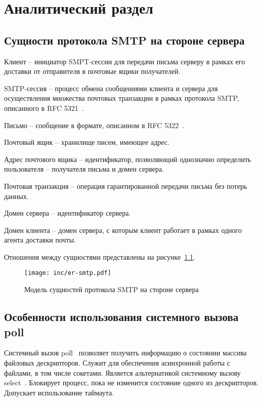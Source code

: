 \chapter{Аналитический раздел}
\label{cha:analysis}

\section{Сущности протокола SMTP на стороне сервера}

Клиент -- инициатор SMPT-сессии для передачи письма серверу в рамках его доставки от отправителя в почтовые ящики получателей.

SMTP-сессия -- процесс обмена сообщениями клиента и сервера для осуществления множества почтовых транзакции в рамках протокола SMTP, описанного в RFC 5321~\cite{RFC-5321}.

Письмо -- сообщение в формате, описанном в RFC 5322~\cite{RFC-5322}.

Почтовый ящик -- хранилище писем, имеющее адрес.

Адрес почтового ящика -- идентификатор, позволяющий однозначно определить пользователя -- получателя письма и домен сервера.

Почтовая транзакция -- операция гарантированной передачи письма без потерь данных.

Домен сервера -- идентификатор сервера.

Домен клиента -- домен сервера, с которым клиент работает в рамках одного агента доставки почты.

Отношения между сущностями представлены на рисунке~\ref{fig:er-smtp}.

\begin{figure}[ht!]
	\centering
	\texttt{[image: inc/er-smtp.pdf]}
	\caption{Модель сущностей протокола SMTP на стороне сервера}
	\label{fig:er-smtp}
\end{figure}

\section{Особенности использования системного вызова poll}

Системный вызов poll~\cite{poll} позволяет получить информацию о состоянии массива файловых дескрипторов.
Служит для обеспечения асинхронной работы с файлами, в том числе сокетами.
Является альтернативой системному вызову select~\cite{select}.
Блокирует процесс, пока не изменится состояние одного из дескрипторов.
Допускает использование таймаута.


